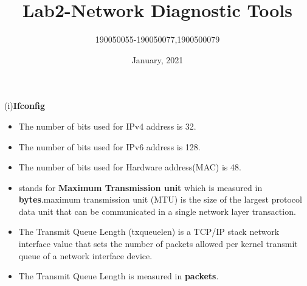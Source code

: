 \documentclass[12pt]{article}
\theoremstyle{remark}
\newcommand{\tbf}[1]{\textbf{#1}}
\begin{document}
\title{Lab2-Network Diagnostic Tools}
\author{190050055-190050077,1900500079}
\date{January, 2021}
\maketitle
\thispagestyle{empty}
\clearpage
{}


\sffamily
\centerline{\Large{(i)\textbf{Ifconfig}}}
\normalsize
\begin{table}[H]
    \centering
    \caption{Ifconfig Data on respective local machines}
    \label{Table 1:}
\end{table}

\begin{itemize}[itemsep = -1mm]
    \item The number of bits used for IPv4 address is 32. 
    \item The number of bits used for IPv6 address is 128.
    \item The number of bits used for Hardware address(MAC) is 48.
    \item \tbf{} stands for \tbf{Maximum Transmission unit} which is measured in \tbf{bytes}.maximum transmission unit (MTU) is the size of the largest protocol data unit
that can be communicated in a single network layer transaction.
    \item The Transmit Queue Length (txqueuelen) is a TCP/IP stack network interface value that sets the number of
packets allowed per kernel transmit queue of a network interface device.
    \item The Transmit Queue Length is measured in \tbf{packets}.
\end{itemize}
\end{document}
